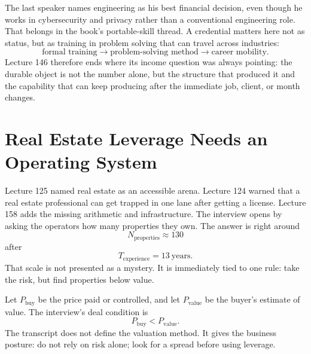 \documentclass[11pt,oneside]{book}
\begin{document}
The last speaker names engineering as his best financial decision, even though he works in cybersecurity and privacy rather than a conventional engineering role. That belongs in the book's portable-skill thread. A credential matters here not as status, but as training in problem solving that can travel across industries:
\[
\text{formal training}
\longrightarrow
\text{problem-solving method}
\longrightarrow
\text{career mobility}.
\]
Lecture 146 therefore ends where its income question was always pointing: the durable object is not the number alone, but the structure that produced it and the capability that can keep producing after the immediate job, client, or month changes.


\section{Real Estate Leverage Needs an Operating System}

Lecture 125 named real estate as an accessible arena. Lecture 124 warned that a real estate professional can get trapped in one lane after getting a license. Lecture 158 adds the missing arithmetic and infrastructure. The interview opens by asking the operators how many properties they own. The answer is right around
\[
N_{\mathrm{properties}}\approx 130
\]
after
\[
T_{\mathrm{experience}}=13\ \text{years}.
\]
That scale is not presented as a mystery. It is immediately tied to one rule: take the risk, but find properties below value.

Let \(P_{\mathrm{buy}}\) be the price paid or controlled, and let \(P_{\mathrm{value}}\) be the buyer's estimate of value. The interview's deal condition is
\[
P_{\mathrm{buy}}<P_{\mathrm{value}}.
\]
The transcript does not define the valuation method. It gives the business posture: do not rely on risk alone; look for a spread before using leverage.
\end{document}

